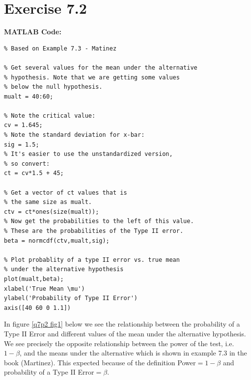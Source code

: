\documentclass[12pt,a4paper]{article}
\begin{document}
\section*{Exercise 7.2}

\textbf{MATLAB Code:}

\begin{verbatim}
% Based on Example 7.3 - Matinez

% Get several values for the mean under the alternative
% hypothesis. Note that we are getting some values
% below the null hypothesis.
mualt = 40:60;

% Note the critical value:
cv = 1.645;
% Note the standard deviation for x-bar:
sig = 1.5;
% It's easier to use the unstandardized version, 
% so convert:
ct = cv*1.5 + 45;

% Get a vector of ct values that is 
% the same size as mualt.
ctv = ct*ones(size(mualt));
% Now get the probabilities to the left of this value.
% These are the probabilities of the Type II error.
beta = normcdf(ctv,mualt,sig);

% Plot probablity of a type II error vs. true mean
% under the alternative hypothesis
plot(mualt,beta);
xlabel('True Mean \mu')
ylabel('Probability of Type II Error')
axis([40 60 0 1.1])

\end{verbatim}

In figure \ref{q7p2 fig1} below we see the relationship between the probability of a Type II Error and different values of the mean under the alternative hypothesis. We see precisely the opposite relationship between the power of the test, i.e. $1-\beta$, and the means under the alternative which is shown in example 7.3 in the book (Martinez). This expected because of the definition Power$=1-\beta$ and probability of a Type II Error$=\beta$.
\end{document}
